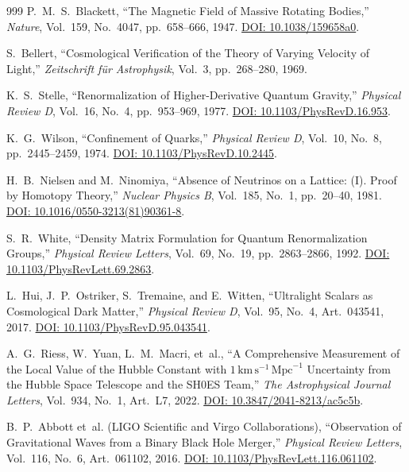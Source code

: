 \documentclass[
    12pt,
    a4paper,
    headings=normal,
    twoside=false,
    open=any,
    parskip=half
]{scrbook}
\begin{document}
\begin{thebibliography}{999}
P.~M.~S.~Blackett, ``The Magnetic Field of Massive Rotating Bodies,'' \textit{Nature}, Vol.~159, No.~4047, pp.~658--666, 1947. \href{https://doi.org/10.1038/159658a0}{DOI: 10.1038/159658a0}.

S.~Bellert, ``Cosmological Verification of the Theory of Varying Velocity of Light,'' \textit{Zeitschrift f\"{u}r Astrophysik}, Vol.~3, pp.~268--280, 1969.

K.~S.~Stelle, ``Renormalization of Higher-Derivative Quantum Gravity,'' \textit{Physical Review D}, Vol.~16, No.~4, pp.~953--969, 1977. \href{https://doi.org/10.1103/PhysRevD.16.953}{DOI: 10.1103/PhysRevD.16.953}.

K.~G.~Wilson, ``Confinement of Quarks,'' \textit{Physical Review D}, Vol.~10, No.~8, pp.~2445--2459, 1974. \href{https://doi.org/10.1103/PhysRevD.10.2445}{DOI: 10.1103/PhysRevD.10.2445}.

H.~B.~Nielsen and M.~Ninomiya, ``Absence of Neutrinos on a Lattice: (I). Proof by Homotopy Theory,'' \textit{Nuclear Physics B}, Vol.~185, No.~1, pp.~20--40, 1981. \href{https://doi.org/10.1016/0550-3213(81)90361-8}{DOI: 10.1016/0550-3213(81)90361-8}.

S.~R.~White, ``Density Matrix Formulation for Quantum Renormalization Groups,'' \textit{Physical Review Letters}, Vol.~69, No.~19, pp.~2863--2866, 1992. \href{https://doi.org/10.1103/PhysRevLett.69.2863}{DOI: 10.1103/PhysRevLett.69.2863}.

L.~Hui, J.~P.~Ostriker, S.~Tremaine, and E.~Witten, ``Ultralight Scalars as Cosmological Dark Matter,'' \textit{Physical Review D}, Vol.~95, No.~4, Art.~043541, 2017. \href{https://doi.org/10.1103/PhysRevD.95.043541}{DOI: 10.1103/PhysRevD.95.043541}.

A.~G.~Riess, W.~Yuan, L.~M.~Macri, et~al., ``A Comprehensive Measurement of the Local Value of the Hubble Constant with $1\,\text{km}\,\text{s}^{-1}\,\text{Mpc}^{-1}$ Uncertainty from the Hubble Space Telescope and the SH0ES Team,'' \textit{The Astrophysical Journal Letters}, Vol.~934, No.~1, Art.~L7, 2022. \href{https://doi.org/10.3847/2041-8213/ac5c5b}{DOI: 10.3847/2041-8213/ac5c5b}.

B.~P.~Abbott et~al. (LIGO Scientific and Virgo Collaborations), ``Observation of Gravitational Waves from a Binary Black Hole Merger,'' \textit{Physical Review Letters}, Vol.~116, No.~6, Art.~061102, 2016. \href{https://doi.org/10.1103/PhysRevLett.116.061102}{DOI: 10.1103/PhysRevLett.116.061102}.


\end{thebibliography}
\end{document}
